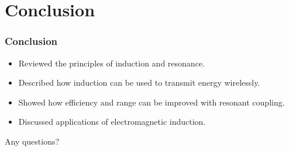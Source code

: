 \documentclass{beamer}
\begin{document}
\section{Conclusion}
\begin{frame}
	\frametitle{Conclusion}
	\begin{itemize}
		\item Reviewed the principles of induction and resonance.
		\item Described how induction can be used to transmit energy wirelessly.
		\item Showed how efficiency and range can be improved with resonant coupling.
		\item Discussed applications of electromagnetic induction.
	\end{itemize}
\end{frame}

\begin{frame}
  \center Any questions?
\end{frame}
\end{document}

